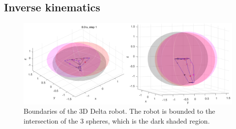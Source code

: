 \subsection{Inverse kinematics}
\begin{figure}[h!]
	\centering
	\includegraphics[width=\textwidth]{figures/Boundaries_3D.png}                                                              
	\caption[Boundaries of the 3D Delta robot]{Boundaries of the 3D Delta robot. The robot is bounded to the intersection of the 3 spheres, which is the dark shaded region.}
	\label{fig:initia3D}
\end{figure}


